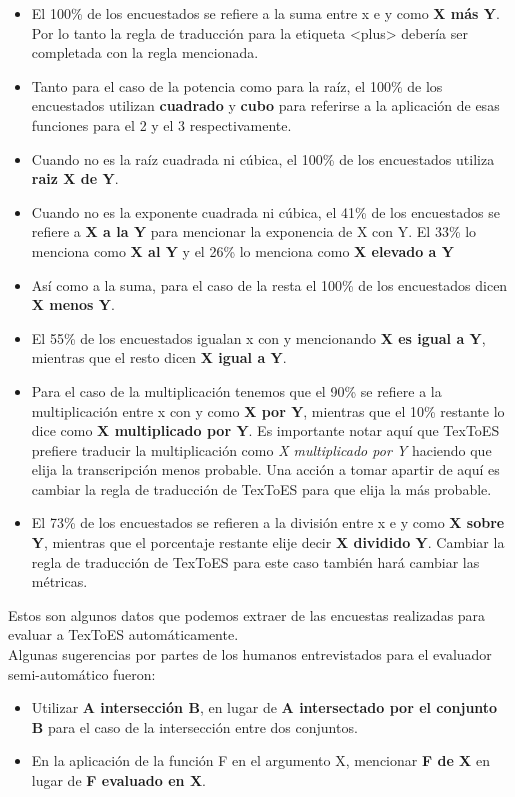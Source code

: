 \begin{itemize}

    \item El 100\% de los encuestados se refiere a la suma entre x e y como \textbf{X más Y}. Por lo tanto la regla de traducción para la etiqueta <plus> debería ser completada con la regla mencionada.
    \item Tanto para el caso de la potencia como para la raíz, el 100\% de los encuestados utilizan \textbf{cuadrado} y \textbf{cubo} para referirse a la aplicación de esas funciones para el 2 y el 3 respectivamente.
    \item Cuando no es la raíz cuadrada ni cúbica, el 100\% de los encuestados utiliza \textbf{raiz X de Y}.
    \item Cuando no es la exponente cuadrada ni cúbica, el 41\% de los encuestados se refiere a \textbf{X a la Y} para mencionar la exponencia de X con Y. El 33\% lo menciona como \textbf{X al Y} y el 26\% lo menciona como \textbf{X elevado a Y}
    \item Así como a la suma, para el caso de la resta el 100\% de los encuestados dicen \textbf{X menos Y}.
    \item El 55\% de los encuestados igualan x con y mencionando \textbf{X es igual a Y}, mientras que el resto dicen \textbf{X igual a Y}.
    \item Para el caso de la multiplicación tenemos que el 90\% se refiere a la multiplicación entre x con y como \textbf{X por Y}, mientras que el 10\% restante lo dice como \textbf{X multiplicado por Y}. Es importante notar aquí que TexToES prefiere traducir la multiplicación como\textit{ X multiplicado por Y} haciendo que elija la transcripción menos probable. Una acción a tomar apartir de aquí es cambiar la regla de traducción de TexToES para que elija la más probable.
    \item El 73\% de los encuestados se refieren a la división entre x e y como \textbf{X sobre Y}, mientras que el porcentaje restante elije decir \textbf{X dividido Y}. Cambiar la regla de traducción de TexToES para este caso también hará cambiar las métricas.

\end{itemize}

Estos son algunos datos que podemos extraer de las encuestas realizadas para evaluar a TexToES automáticamente.\\

Algunas sugerencias por partes de los humanos entrevistados para el evaluador semi-automático fueron:
\begin{itemize}
\item Utilizar \textbf{A intersección B}, en lugar de \textbf{A intersectado por el conjunto B} para el caso de la intersección entre dos conjuntos.
\item En la aplicación de la función F en el argumento X, mencionar \textbf{F de X} en lugar de \textbf{F evaluado en X}.
\end{itemize}

